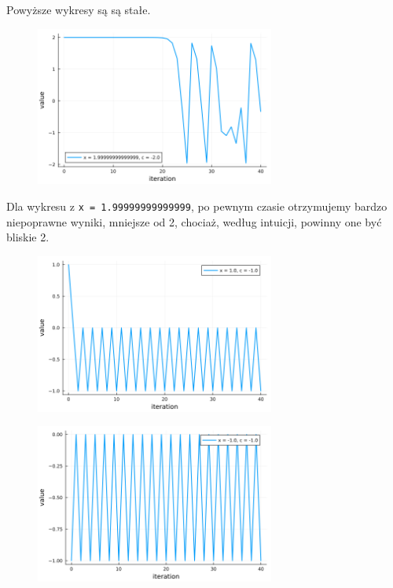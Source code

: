 \documentclass[15pt, a4paper]{article}
\begin{document}
\noindent Powyższe wykresy są są stałe.

\vspace{0.5cm}

\begin{figure}[h]
    \centering
    \includegraphics[width=0.7\textwidth]{img/6_3_plot.png}
\end{figure}

\vspace{0.5cm}

\noindent Dla wykresu z \verb|x = 1.99999999999999|, po pewnym czasie otrzymujemy bardzo niepoprawne wyniki, mniejsze od 2, chociaż, według intuicji, powinny one być bliskie 2.

\vspace{0.5cm}

\begin{figure}[h]
    \centering
    \includegraphics[width=0.7\textwidth]{img/6_4_plot.png}
\end{figure}

\begin{figure}[h]
    \centering
    \includegraphics[width=0.7\textwidth]{img/6_5_plot.png}
\end{figure}
\end{document}
